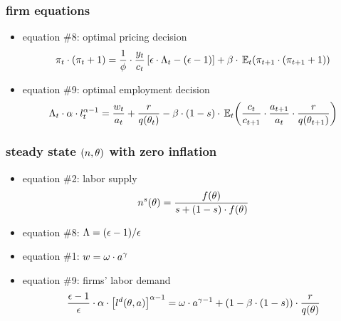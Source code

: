 \documentclass[12pt,xcolor={dvipsnames},hyperref={pdftex,pdfpagemode=UseNone,hidelinks,pdfdisplaydoctitle=true},usepdftitle=false]{beamer}
\begin{document}
\begin{frame}
\frametitle{firm equations}
\begin{itemize}
\item equation \#8: optimal pricing decision
\begin{equation*}
\pi_{t}\cdot\bp{\pi_{t}+1}=\frac{1}{\f} \cdot\frac{y_{t}}{c_{t}} \bs{\e \cdot\L_{t}-\bp{\e-1}}+\b\cdot\E[t]{\pi_{t+1}\cdot \bp{\pi_{t+1}+1}}
\end{equation*}
\item equation \#9: optimal employment decision
\begin{equation*}
\L_{t}\cdot \a\cdot l_{t}^{\a-1} = \frac{w_{t}}{a_{t}}+\frac{r}{q(\t_{t})}-\b \cdot (1-s)\cdot  \E[t]{\frac{c_{t}}{c_{t+1}}\cdot \frac{a_{t+1}}{a_{t}}\cdot \frac{r}{q(\t_{t+1})}}
\end{equation*}
\end{itemize}
\end{frame}

\begin{frame}
\frametitle{steady state $(n,\theta)$ with zero inflation}
\begin{itemize}
\item equation \#2: labor supply
\begin{equation*}
n^{s}(\theta)=\frac{f(\theta)}{s+(1-s)\cdot f(\theta)}
\end{equation*}
\item equation \#8: $\Lambda=(\epsilon-1)/\epsilon$
\item equation \#1: $w=\omega\cdot a^{\gamma}$
\item equation \#9: firms' labor demand
\begin{equation*}
\frac{\epsilon-1}{\epsilon}\cdot \alpha\cdot \left[ l^{d}(\theta,a) \right]^{\alpha-1}=\omega\cdot a^{\gamma-1}+\left( 1-\beta \cdot (1-s) \right)\cdot\frac{r}{q(\theta)}
\end{equation*}
\end{itemize}
\end{frame}

\begin{frame}
\end{frame}
\end{document}
